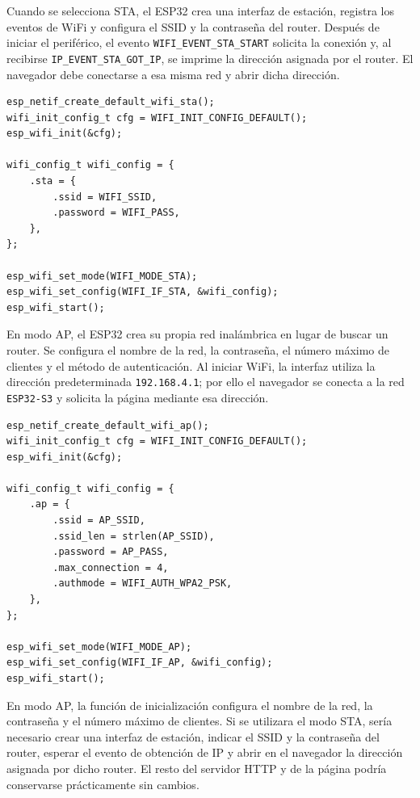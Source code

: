 \documentclass[12pt, letterpaper]{article}
\begin{document}
Cuando se selecciona STA, el ESP32 crea una interfaz de estación, registra los
eventos de WiFi y configura el SSID y la contraseña del router. Después de
iniciar el periférico, el evento \texttt{WIFI\_EVENT\_STA\_START} solicita la
conexión y, al recibirse \texttt{IP\_EVENT\_STA\_GOT\_IP}, se imprime la
dirección asignada por el router. El navegador debe conectarse a esa misma red
y abrir dicha dirección.

\begin{lstlisting}[style=cstyle, caption={Configuración de la conexión WiFi en modo STA}, label={lst:wifi-sta}]
esp_netif_create_default_wifi_sta();
wifi_init_config_t cfg = WIFI_INIT_CONFIG_DEFAULT();
esp_wifi_init(&cfg);

wifi_config_t wifi_config = {
    .sta = {
        .ssid = WIFI_SSID,
        .password = WIFI_PASS,
    },
};

esp_wifi_set_mode(WIFI_MODE_STA);
esp_wifi_set_config(WIFI_IF_STA, &wifi_config);
esp_wifi_start();
\end{lstlisting}

En modo AP, el ESP32 crea su propia red inalámbrica en lugar de buscar un
router. Se configura el nombre de la red, la contraseña, el número máximo de
clientes y el método de autenticación. Al iniciar WiFi, la interfaz utiliza la
dirección predeterminada \texttt{192.168.4.1}; por ello el navegador se conecta
a la red \texttt{ESP32-S3} y solicita la página mediante esa dirección.

\begin{lstlisting}[style=cstyle, caption={Configuración del punto de acceso WiFi}, label={lst:wifi-ap}]
esp_netif_create_default_wifi_ap();
wifi_init_config_t cfg = WIFI_INIT_CONFIG_DEFAULT();
esp_wifi_init(&cfg);

wifi_config_t wifi_config = {
    .ap = {
        .ssid = AP_SSID,
        .ssid_len = strlen(AP_SSID),
        .password = AP_PASS,
        .max_connection = 4,
        .authmode = WIFI_AUTH_WPA2_PSK,
    },
};

esp_wifi_set_mode(WIFI_MODE_AP);
esp_wifi_set_config(WIFI_IF_AP, &wifi_config);
esp_wifi_start();
\end{lstlisting}

En modo AP, la función de inicialización configura el nombre de la red, la
contraseña y el número máximo de clientes. Si se utilizara el modo STA, sería
necesario crear una interfaz de estación, indicar el SSID y la contraseña del
router, esperar el evento de obtención de IP y abrir en el navegador la
dirección asignada por dicho router. El resto del servidor HTTP y de la página
podría conservarse prácticamente sin cambios.
\end{document}
